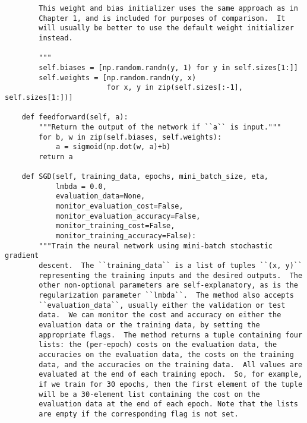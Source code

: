 \begin{lstlisting}
        This weight and bias initializer uses the same approach as in
        Chapter 1, and is included for purposes of comparison.  It
        will usually be better to use the default weight initializer
        instead.

        """
        self.biases = [np.random.randn(y, 1) for y in self.sizes[1:]]
        self.weights = [np.random.randn(y, x)
                        for x, y in zip(self.sizes[:-1], self.sizes[1:])]

    def feedforward(self, a):
        """Return the output of the network if ``a`` is input."""
        for b, w in zip(self.biases, self.weights):
            a = sigmoid(np.dot(w, a)+b)
        return a

    def SGD(self, training_data, epochs, mini_batch_size, eta,
            lmbda = 0.0,
            evaluation_data=None,
            monitor_evaluation_cost=False,
            monitor_evaluation_accuracy=False,
            monitor_training_cost=False,
            monitor_training_accuracy=False):
        """Train the neural network using mini-batch stochastic gradient
        descent.  The ``training_data`` is a list of tuples ``(x, y)``
        representing the training inputs and the desired outputs.  The
        other non-optional parameters are self-explanatory, as is the
        regularization parameter ``lmbda``.  The method also accepts
        ``evaluation_data``, usually either the validation or test
        data.  We can monitor the cost and accuracy on either the
        evaluation data or the training data, by setting the
        appropriate flags.  The method returns a tuple containing four
        lists: the (per-epoch) costs on the evaluation data, the
        accuracies on the evaluation data, the costs on the training
        data, and the accuracies on the training data.  All values are
        evaluated at the end of each training epoch.  So, for example,
        if we train for 30 epochs, then the first element of the tuple
        will be a 30-element list containing the cost on the
        evaluation data at the end of each epoch. Note that the lists
        are empty if the corresponding flag is not set.


\end{lstlisting}
